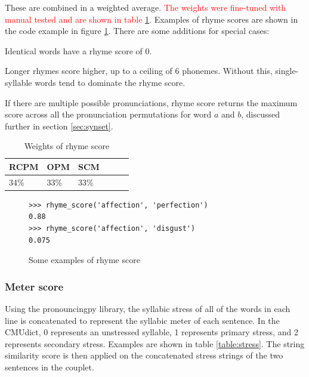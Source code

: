 \documentclass[11pt,a4paper]{article}
\newenvironment{tight_enumerate}{
\begin{enumerate}
\setlength{\itemsep}{0pt}
\setlength{\parskip}{0pt}
}{\end{enumerate}}
\begin{document}
These are combined in a weighted average. \textcolor{red}{The weights were fine-tuned with manual tested and are shown in table \ref{table:weight_rhyme_score}}. Examples of rhyme scores are shown in the code example in figure \ref{fig:rhymescorecode}. There are some additions for special cases:
\begin{tight_enumerate}
	\vspace{-0.5em}
	\item
		Identical words have a rhyme score of 0.
	\item
		Longer rhymes score higher, up to a ceiling of 6 phonemes. Without this, single-syllable words tend to dominate the rhyme score.
	\item
		If there are multiple possible pronunciations, rhyme score returns the maximum score across all the pronunciation permutations for word $a$ and $b$, discussed further in section \ref{sec:synset}.
\end{tight_enumerate}

\begin{table}[ht]
\centering
\begin{tabular}{lll c c c}
	\hline\hline
	RCPM & OPM & SCM \\ [0.5ex]
	\hline\hline
	34\% & 33\% & 33\% \\ [0.5ex]
	\hline
\end{tabular}
\caption{Weights of rhyme score}
\label{table:weight_rhyme_score}
\end{table}

\begin{figure}
\begin{Verbatim}[fontsize=\small]
>>> rhyme_score('affection', 'perfection')
0.88
>>> rhyme_score('affection', 'disgust')
0.075
\end{Verbatim}
\caption{Some examples of rhyme score}
\label{fig:rhymescorecode}
\end{figure}

\subsubsection{Meter score}
\label{sec:stressscore}

Using the pronouncingpy library, the syllabic stress of all of the words in each line is concatenated to represent the syllabic meter \cite{meter_def} of each sentence. In the CMUdict, 0 represents an unstressed syllable, 1 represents primary stress, and 2 represents secondary stress.  Examples are shown in table \ref{table:stress}. The \citet{ratcliff} string similarity score is then applied on the concatenated stress strings of the two sentences in the couplet.
\end{document}
